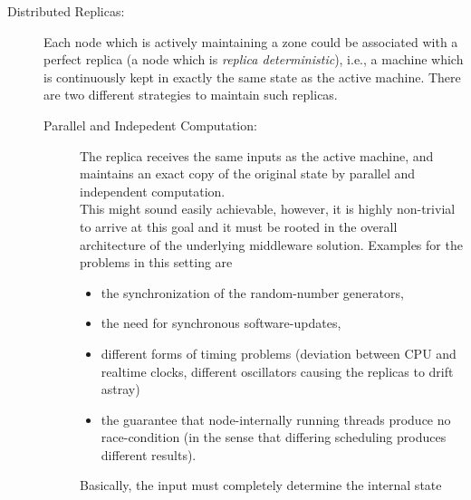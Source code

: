 \documentclass[a4paper, 10pt]{book}
\begin{document}
            \begin{description}

                \item[Distributed Replicas:] Each node which is actively maintaining a
                    zone could be associated with a perfect replica (a node
                    which is \emph{replica deterministic}), i.e., a machine which is
                    continuously kept in exactly the same state as the active machine.
                    There are two different strategies to maintain such replicas.
                    \begin{description}
                        \item[Parallel and Indepedent Computation:] The replica receives the
                            same inputs as the active machine, and maintains an exact copy of
                            the original state by parallel and independent computation.\\
                            This might sound easily achievable, however, it is highly
                            non-trivial to arrive at this goal and it must be rooted in the
                            overall architecture of the underlying middleware solution.
                            Examples for the problems in this setting are 
                            \begin{itemize}
                                \item the synchronization of the random-number generators, 
                                \item the need for synchronous software-updates,
                                \item different forms of timing problems (deviation between CPU and
                                    realtime clocks, different oscillators causing the replicas to
                                    drift astray)
                                \item the guarantee that node-internally running threads produce no
                                    race-condition (in the sense that differing scheduling produces
                                    different results).
                            \end{itemize}
                            Basically, the input must completely determine the
                            internal state

\end{description}
\end{description}
\end{document}
